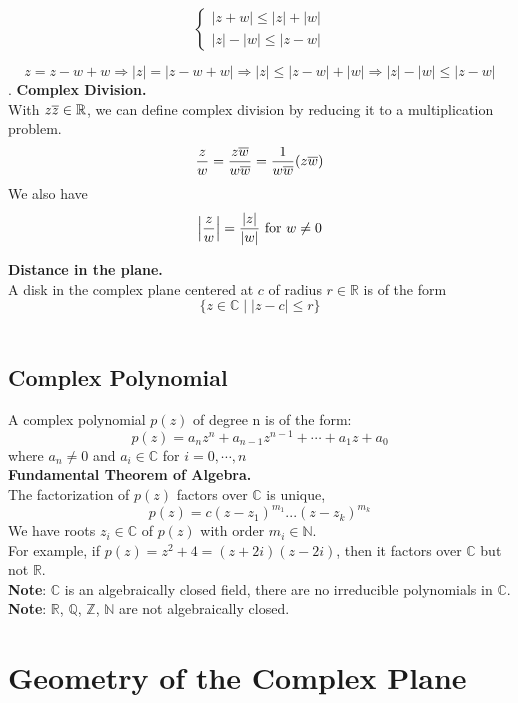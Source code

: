 \documentclass[11pt]{article}
\DeclarePairedDelimiter\abs{\lvert}{\rvert}
\begin{document}
\[ \begin{cases} 
      |z + w| \leqslant |z| + |w| \\
      |z| - |w| \leqslant |z - w|
   \end{cases}
\]

$$z = z - w + w \Rightarrow |z| = |z - w + w| \Rightarrow |z| \leqslant |z - w| + |w| \Rightarrow |z| - |w| \leqslant |z - w|$$. 
\newline
\textbf{Complex Division.} \\
With $z\overline{z} \in \mathbb{R}$, we can define complex division by reducing it to a multiplication problem. 
$$\frac{z}{w} = \frac{z\overline{w}}{w\overline{w}} = \frac{1}{w\overline{w}}(z\overline{w})$$ 
We also have 
\begin{equation*} 
\abs[\Big]{\frac{z}{w}} = \frac{|z|}{|w|} \mbox{ for } w \neq 0 
\end{equation*}

\textbf{Distance in the plane.} \\
A disk in the complex plane centered at $c$ of radius $r \in \mathbb{R}$ is of the form 
$$\{z \in \mathbb{C} \mid |z - c| \leqslant r\}$$
\\
\subsection{Complex Polynomial}
A complex polynomial $p(z)$ of degree n is of the form: 
$$p(z) = a_nz^n + a_{n - 1}z^{n - 1} + \cdots + a_1z + a_0$$
where $a_n \neq 0$ and $a_i \in \mathbb{C}$ for $ i = 0, \cdots , n$ \\
\newline
\textbf{Fundamental Theorem of Algebra.} \\

The factorization of $p(z)$ factors over $\mathbb{C}$ is unique, 
$$p(z) = c(z - z_1)^{m_1}...(z - z_k)^{m_k}$$
We have roots $z_i \in \mathbb{C}$ of $p(z)$ with order $m_i \in \mathbb{N}$. \\
For example, if $p(z) = z^2 + 4 = (z + 2i)(z - 2i)$, then it factors over $\mathbb{C}$ but not $\mathbb{R}$. \\
\textbf{Note}: 
$\mathbb{C}$ is an algebraically closed field, there are no irreducible polynomials in $\mathbb{C}$. \\
\textbf{Note}: 
$\mathbb{R}$,  $\mathbb{Q}$, $\mathbb{Z}$, $\mathbb{N}$ are not algebraically closed. \\

\newpage
\section{Geometry of the Complex Plane}
\end{document}
